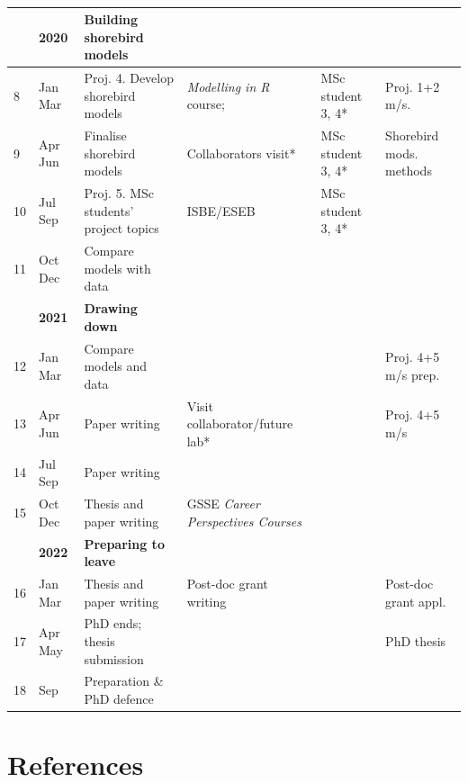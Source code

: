 \begin{table}
\begin{turn}{90}
\begin{tabular}{llllll}
\toprule
 & \textbf{\footnotesize{}2020} & \textbf{\footnotesize{}Building shorebird models} &  &  & \tabularnewline
\hline
{\footnotesize{}8} & {\footnotesize{}Jan \textendash{} Mar} & {\footnotesize{}Proj. 4. Develop shorebird models} & {\footnotesize{}\emph{Modelling in R} course;} & {\footnotesize{}MSc student 3, 4{*}} & {\footnotesize{}Proj. 1+2 m/s.}\tabularnewline
\hdashline
{\footnotesize{}9} & {\footnotesize{}Apr \textendash{} Jun} & {\footnotesize{}Finalise shorebird models} & {\footnotesize{}Collaborators visit*} & {\footnotesize{}MSc student 3, 4{*}} & {\footnotesize{}Shorebird mods. methods}\tabularnewline
\hdashline
{\footnotesize{}10} & {\footnotesize{}Jul \textendash{} Sep} & {\footnotesize{}Proj. 5. MSc students' project topics} & {\footnotesize{}ISBE/ESEB} & {\footnotesize{}MSc student 3, 4{*}} & \tabularnewline
\hdashline
{\footnotesize{}11} & {\footnotesize{}Oct \textendash{} Dec} & {\footnotesize{}Compare models with data} &  &  & \tabularnewline

\toprule
 & \textbf{\footnotesize{}2021} & \textbf{\footnotesize{}Drawing down} &  &  & \tabularnewline
\hline
{\footnotesize{}12} & {\footnotesize{}Jan \textendash{} Mar} & {\footnotesize{}Compare models and data} &  &  & {\footnotesize{}Proj. 4+5 m/s prep.}\tabularnewline
\hdashline
{\footnotesize{}13} & {\footnotesize{}Apr \textendash{} Jun} & {\footnotesize{}Paper writing} & {\footnotesize{}Visit collaborator/future lab{*}} &  & {\footnotesize{}Proj. 4+5 m/s}\tabularnewline
\hdashline
{\footnotesize{}14} & {\footnotesize{}Jul \textendash{} Sep} & {\footnotesize{}Paper writing} &  &  & \tabularnewline
\hdashline
{\footnotesize{}15} & {\footnotesize{}Oct \textendash{} Dec} & {\footnotesize{}Thesis and paper writing} & {\footnotesize{}GSSE \emph{Career Perspectives Courses}} &  & \tabularnewline

\toprule
 & \textbf{\footnotesize{}2022} & \textbf{\footnotesize{}Preparing to leave} &  &  & \tabularnewline
\hline
{\footnotesize{}16} & {\footnotesize{}Jan \textendash{} Mar} & {\footnotesize{}Thesis and paper writing} & {\footnotesize{}Post-doc grant writing} &  & {\footnotesize{}Post-doc grant appl.}\tabularnewline
\hdashline
{\footnotesize{}17} & {\footnotesize{}Apr \textendash{} May} & {\footnotesize{}PhD ends; thesis submission} &  &  & {\footnotesize{}PhD thesis}\tabularnewline
\hdashline
{\footnotesize{}18} & {\footnotesize{} Sep} & {\footnotesize{}Preparation \& PhD defence} &  &  & \tabularnewline

\bottomrule

\end{tabular}
\end{turn}

\caption{}

\end{table}

\newpage

\restoregeometry

\part{References}
\footnotesize

\setlength{\parskip}{3pt plus 2pt minus 1pt}
\setlength{\parindent}{-3ex}
\indent



